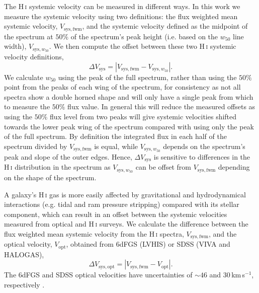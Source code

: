 \documentclass[fleqn,usenatbib]{mnras}
\begin{document}
The H\,\textsc{i} systemic velocity can be measured in different ways. In this work we measure the systemic velocity using two definitions: the flux weighted mean systemic velocity, $V_{\mathrm{sys,fwm}}$, and the systemic velocity defined as the midpoint of the spectrum at $50\%$ of the spectrum's peak height (i.e. based on the $w_{50}$ line width), $V_{\mathrm{sys},w_{50}}$. We then compute the offset between these two H\,\textsc{i} systemic velocity definitions,
\begin{equation}
	\displaystyle \Delta V_{\mathrm{sys}}=|V_{\mathrm{sys,fwm}}-V_{\mathrm{sys},w_{50}}|.
	\label{equ:vrad_diff}
\end{equation}
We calculate $w_{50}$ using the peak of the full spectrum, rather than using the $50\%$ point from the peaks of each wing of the spectrum, for consistency as not all spectra show a double horned shape and will only have a single peak from which to measure the $50\%$ flux value. In general this will reduce the measured offsets as using the $50\%$ flux level from two peaks will give systemic velocities shifted towards the lower peak wing of the spectrum compared with using only the peak of the full spectrum. By definition the integrated flux in each half of the spectrum divided by $V_{\mathrm{sys,fwm}}$ is equal, while $V_{\mathrm{sys},w_{50}}$ depends on the spectrum's peak and slope of the outer edges. Hence, $\Delta V_{\mathrm{sys}}$ is sensitive to differences in the H\,\textsc{i} distribution in the spectrum as $V_{\mathrm{sys},w_{50}}$ can be offset from $V_{\mathrm{sys,fwm}}$ depending on the shape of the spectrum. 

A galaxy's H\,\textsc{i} gas is more easily affected by gravitational and hydrodynamical interactions (e.g. tidal and ram pressure stripping) compared with its stellar component, which can result in an offset between the systemic velocities measured from optical and H\,\textsc{i} surveys. We calculate the difference between the flux weighted mean systemic velocity from the H\,\textsc{i} spectra, $V_{\mathrm{sys,fwm}}$, and the optical velocity, $V_{\mathrm{opt}}$, obtained from 6dFGS (LVHIS) or SDSS (VIVA and HALOGAS),
\begin{equation}
	\displaystyle \Delta V_{\mathrm{sys,opt}}=|V_{\mathrm{sys,fwm}}-V_{\mathrm{opt}}|.
	\label{equ:vopt_diff}
\end{equation}
The 6dFGS and SDSS optical velocities have uncertainties of $\sim46$ and 30\,km\,s$^{-1}$, respectively \citep{Jones2009,Strauss2002}.

\end{document}
